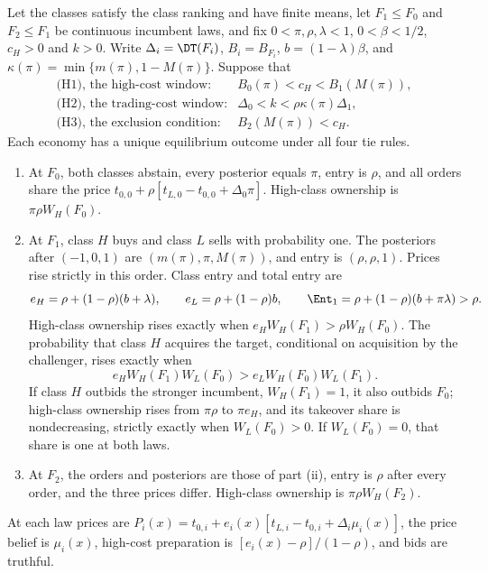 \begin{proposition}\label{prop:ccc}
Let the classes satisfy the class ranking and have finite means, let \(F_1\le F_0\) and \(F_2\le F_1\) be
continuous incumbent laws, and fix \(0<\pi,\rho,\lambda<1\), \(0<\beta<1/2\), \(c_H>0\) and \(k>0\). Write
\(\Delta_i=\DT(F_i)\), \(B_i=B_{F_i}\), \(b=(1-\lambda)\beta\), and
\(\kappa(\pi)=\min\{m(\pi),1-M(\pi)\}\). Suppose that
\[
\begin{array}{ll}
\text{(H1), the high-cost window:}& B_0(\pi)<c_H<B_1(M(\pi)),\\
\text{(H2), the trading-cost window:}& \Delta_0<k<\rho\kappa(\pi)\Delta_1,\\
\text{(H3), the exclusion condition:}& B_2(M(\pi))<c_H.
\end{array}
\]
Each economy has a unique equilibrium outcome under all four tie rules.
\begin{enumerate}[label=(\roman*),leftmargin=2em]
\item At \(F_0\), both classes abstain, every posterior equals \(\pi\), entry is \(\rho\), and all orders share the
price \(t_{0,0}+\rho[t_{L,0}-t_{0,0}+\Delta_0\pi]\). High-class ownership is \(\pi\rho W_H(F_0)\).
\item At \(F_1\), class \(H\) buys and class \(L\) sells with probability one. The posteriors after
\((-1,0,1)\) are \((m(\pi),\pi,M(\pi))\), and entry is \((\rho,\rho,1)\). Prices rise strictly in this order.
Class entry and total entry are
\[
e_H=\rho+(1-\rho)(b+\lambda),\qquad e_L=\rho+(1-\rho)b,\qquad
\Ent_1=\rho+(1-\rho)(b+\pi\lambda)>\rho.
\]
High-class ownership rises exactly when \(e_HW_H(F_1)>\rho W_H(F_0)\). The probability that class \(H\) acquires
the target, conditional on acquisition by the challenger, rises exactly when
\begin{equation}\label{eq:a3-share}
e_HW_H(F_1)W_L(F_0)>e_LW_H(F_0)W_L(F_1).
\end{equation}
If class \(H\) outbids the stronger incumbent, \(W_H(F_1)=1\), it also outbids \(F_0\); high-class ownership
rises from \(\pi\rho\) to \(\pi e_H\), and its takeover share is nondecreasing, strictly exactly when
\(W_L(F_0)>0\). If \(W_L(F_0)=0\), that share is one at both laws.
\item At \(F_2\), the orders and posteriors are those of part (ii), entry is \(\rho\) after every order, and the
three prices differ. High-class ownership is \(\pi\rho W_H(F_2)\).
\end{enumerate}
At each law prices are \(P_i(x)=t_{0,i}+e_i(x)[t_{L,i}-t_{0,i}+\Delta_i\mu_i(x)]\), the price belief is
\(\mu_i(x)\), high-cost preparation is \([e_i(x)-\rho]/(1-\rho)\), and bids are truthful.
\end{proposition}
